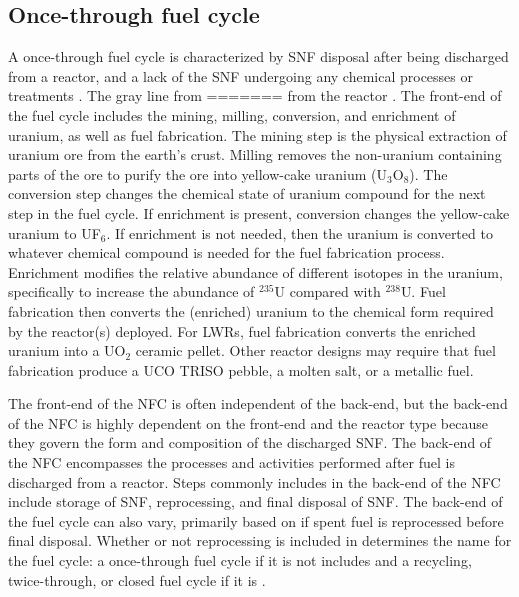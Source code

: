 \subsection{Once-through fuel cycle}
A once-through fuel cycle is characterized by \gls{SNF} disposal
after being discharged from a reactor, and a lack of the 
\gls{SNF} undergoing any chemical processes 
or treatments \cite{rodriguez-penalonga_review_2017}. The gray line from 
=======
from the reactor \cite{rodriguez-penalonga_review_2017}. The 
front-end of the fuel cycle includes the mining, 
milling, conversion, and enrichment of uranium, as well as 
fuel fabrication. The mining step is the physical extraction of uranium 
ore from the earth's crust. Milling removes the non-uranium containing 
parts of the ore to purify the ore into yellow-cake uranium (U$_3$O$_8$).
The conversion step changes the chemical state of uranium compound 
for the next step in the fuel cycle. If enrichment is present, conversion 
changes the yellow-cake uranium to UF$_6$. If enrichment is not 
needed, then the uranium is converted to whatever chemical compound is 
needed for the fuel fabrication process. Enrichment modifies the 
relative abundance of different isotopes in the uranium, specifically 
to increase the abundance of $^{235}$U compared with $^{238}$U. Fuel 
fabrication then converts the (enriched) uranium to the chemical 
form required by the reactor(s) deployed. For \glspl{LWR}, fuel 
fabrication converts the enriched uranium into a UO$_2$ ceramic 
pellet. Other reactor designs may require that fuel fabrication 
produce a UCO \gls{TRISO} pebble, a molten salt, or a metallic fuel. 

The front-end of 
the \gls{NFC} is often independent of the back-end, but the back-end 
of the \gls{NFC} is highly dependent on the front-end and the reactor 
type because they govern the form and composition of the discharged 
\acrfull{SNF}. The back-end of the \gls{NFC} encompasses the 
processes and activities performed after fuel is discharged from 
a reactor. Steps commonly includes in the back-end of the \gls{NFC} 
include storage of \gls{SNF}, reprocessing, and final disposal of 
\gls{SNF}. 
The back-end of the fuel cycle can also vary, primarily based on if spent 
fuel is reprocessed before final disposal. Whether or not reprocessing is 
included in determines the name for the fuel cycle: a once-through
fuel cycle if it is not includes and a recycling, twice-through, 
or closed fuel cycle if it is \cite{tsoulfanidis_nuclear_2013}. 

